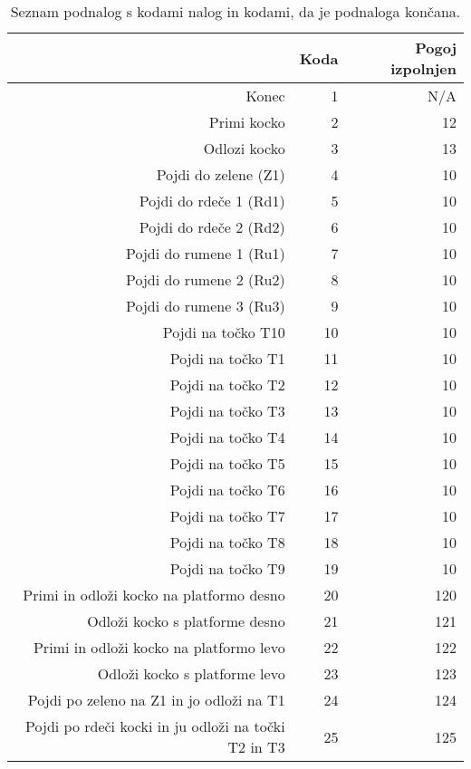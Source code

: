 \begin{table}[htbp]
  \centering
  \caption{Seznam podnalog s kodami nalog in kodami, da je podnaloga končana.}
    \begin{tabular}{rrr}
    \toprule
          & Koda  & Pogoj izpolnjen \\
    \midrule
    Konec & 1     & N/A \\ \hline
    Primi kocko & 2     & 12 \\ \hline
    Odlozi kocko & 3     & 13 \\ \hline
    Pojdi do zelene (Z1) & 4     & 10 \\ \hline
    Pojdi do rdeče 1 (Rd1) & 5     & 10 \\ \hline
    Pojdi do rdeče 2 (Rd2) & 6     & 10 \\ \hline
    Pojdi do rumene 1 (Ru1) & 7     & 10 \\ \hline
    Pojdi do rumene 2 (Ru2) & 8     & 10 \\ \hline
    Pojdi do rumene 3 (Ru3) & 9     & 10 \\ \hline
    Pojdi na točko T10 & 10    & 10 \\ \hline
    Pojdi na točko T1 & 11    & 10 \\ \hline
    Pojdi na točko T2 & 12    & 10 \\ \hline
    Pojdi na točko T3 & 13    & 10 \\ \hline
    Pojdi na točko T4 & 14    & 10 \\ \hline
    Pojdi na točko T5 & 15    & 10 \\ \hline
    Pojdi na točko T6 & 16    & 10 \\ \hline
    Pojdi na točko T7 & 17    & 10 \\ \hline
    Pojdi na točko T8 & 18    & 10 \\ \hline
    Pojdi na točko T9 & 19    & 10 \\ \hline
    Primi in odloži kocko na platformo desno & 20    & 120 \\ \hline
    Odloži kocko s platforme desno & 21    & 121 \\ \hline
    Primi in odloži kocko na platformo levo & 22    & 122 \\ \hline
    Odloži kocko s platforme levo & 23    & 123 \\ \hline
    Pojdi po zeleno na Z1 in jo odloži na T1 & 24    & 124 \\ \hline
    Pojdi po rdeči kocki in ju odloži na točki T2 in T3 & 25    & 125 \\ \hline

\end{tabular}
\end{table}
